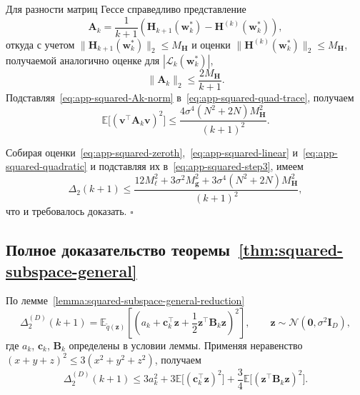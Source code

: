 Для разности матриц Гессе справедливо представление
\begin{equation}
    \mathbf A_k = \frac{1}{k+1}\left( \mathbf H_{k+1}(\mathbf w_k^*) - \mathbf H^{(k)}(\mathbf w_k^*) \right),
\end{equation}
откуда с учетом $\|\mathbf H_{k+1}(\mathbf w_k^*)\|_2 \leqslant M_{\mathbf H}$ и оценки $\|\mathbf H^{(k)}(\mathbf w_k^*)\|_2 \leqslant M_{\mathbf H}$, получаемой аналогично оценке для $|\mathcal L_k(\mathbf w_k^*)|$,
\begin{equation}
    \label{eq:app-squared-Ak-norm}
    \|\mathbf A_k\|_2 \leqslant \frac{2M_{\mathbf H}}{k+1}.
\end{equation}
Подставляя~\eqref{eq:app-squared-Ak-norm} в~\eqref{eq:app-squared-quad-trace}, получаем
\begin{equation}
    \label{eq:app-squared-quadratic}
    \mathbb E\big[(\mathbf v^\top \mathbf A_k \mathbf v)^2\big]
    \leqslant
    \frac{4\sigma^4 (N^2+2N)M_{\mathbf H}^2}{(k+1)^2}.
\end{equation}

Собирая оценки~\eqref{eq:app-squared-zeroth},~\eqref{eq:app-squared-linear} и~\eqref{eq:app-squared-quadratic} и подставляя их в~\eqref{eq:app-squared-step3}, имеем
\begin{equation}
    \Delta_2(k+1)
    \leqslant
    \frac{
        12M_\ell^2
        +
        3\sigma^2 M_{\mathbf g}^2
        +
        3\sigma^4 (N^2+2N)M_{\mathbf H}^2
    }{(k+1)^2},
\end{equation}
что и требовалось доказать. \hfill$\square$

\subsection*{Полное доказательство теоремы~\ref{thm:squared-subspace-general}}\label{app:proof-subspace}

По лемме~\ref{lemma:squared-subspace-general-reduction}
\begin{equation}
    \Delta_2^{(D)}(k+1)
    =
    \mathbb E_{\tilde q(\mathbf z)}
    \left[
        \left(
            a_k+\mathbf c_k^\top \mathbf z+\frac12 \mathbf z^\top \mathbf B_k \mathbf z
        \right)^2
    \right],
    \qquad
    \mathbf z \sim \mathcal N(\mathbf 0,\sigma^2\mathbf I_D),
\end{equation}
где $a_k$, $\mathbf c_k$, $\mathbf B_k$ определены в условии леммы. Применяя неравенство $(x+y+z)^2 \leqslant 3(x^2+y^2+z^2)$, получаем
\begin{equation}
    \label{eq:app-subspace-step1}
    \Delta_2^{(D)}(k+1)
    \leqslant
    3a_k^2
    +
    3\mathbb E\big[(\mathbf c_k^\top \mathbf z)^2\big]
    +
    \frac34 \mathbb E\big[(\mathbf z^\top \mathbf B_k \mathbf z)^2\big].
\end{equation}

